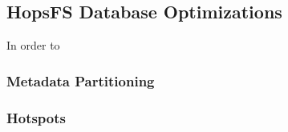 \subsection{HopsFS Database Optimizations}
In order to
\subsubsection{Metadata Partitioning}
\subsubsection{Hotspots}